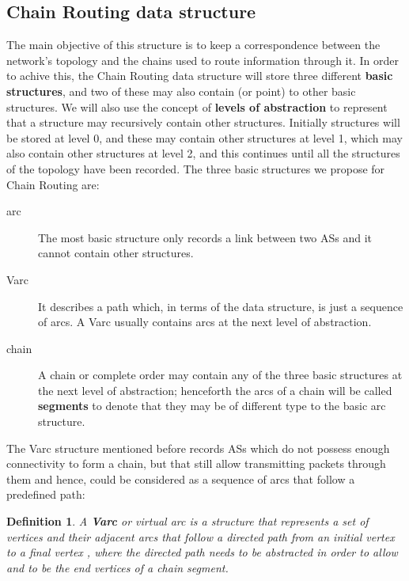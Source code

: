 \documentclass[5p,twocolumn]{elsarticle}
\newtheorem{definition}{Definition}
\begin{document}
\subsection{Chain Routing data structure}\label{crds}

The main objective of this structure is to keep a correspondence between the network's topology and the chains used to route information through it. In order to achive this, the Chain Routing data structure will store three different \textbf{basic structures}, and two of these may also contain (or point) to other basic structures. We will also use the concept of \textbf{levels of abstraction} to represent that a structure may recursively contain other structures. Initially structures will be stored at level 0, and these may contain other structures at level 1, which may also contain other structures at level 2, and this continues until all the structures of the topology have been recorded. The three basic structures we propose for Chain Routing are:

\begin{description}
	\item[arc] The most basic structure only records a link between two ASs and it cannot contain other structures.
	\item[Varc] It describes a path which, in terms of the data structure, is just a sequence of arcs. A Varc usually contains arcs at the next level of abstraction.
\item[chain] A chain or complete order may contain any of the three basic structures at the next level of abstraction; henceforth the arcs of a chain will be called \textbf{segments} to denote that they may be of different type to the basic arc structure.
\end{description}

The Varc structure mentioned before records ASs which do not possess enough connectivity to form a chain, but that still allow transmitting packets through them and hence, could be considered as a sequence of arcs that follow a predefined path:

\begin{definition}\label{D:david_69}
A \textbf{Varc} or virtual arc is a structure that represents a set of vertices and their adjacent arcs that follow a directed path from an initial vertex  to a final vertex , where the directed path needs to be abstracted in order to allow  and  to be the end vertices of a chain segment.
\end{definition}
\end{document}
